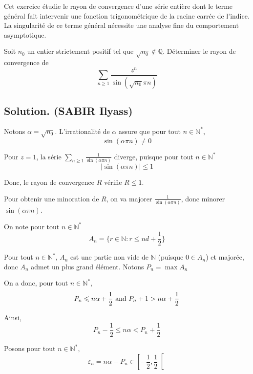 Cet exercice {\'e}tudie le rayon de convergence d'une s{\'e}rie enti{\`e}re
dont le terme g{\'e}n{\'e}ral fait intervenir une fonction trigonom{\'e}trique
de la racine carr{\'e}e de l'indice. La singularit{\'e} de ce terme
g{\'e}n{\'e}ral n{\'e}cessite une analyse fine du comportement asymptotique.

\begin{exercise}
Soit $n_0$ un entier strictement positif tel que $\sqrt{n_0} \nin \mathbb{Q}$.
D{\'e}terminer le rayon de convergence de
\[ \underset{n \geqslant 1}{\sum} \frac{z^n}{\sin (\sqrt{n_0 } \pi n)} \]

\end{exercise}

\subsection*{Solution. (SABIR Ilyass)}

Notons $\alpha = \sqrt{n_0 }$. L'irrationalit{\'e} de $\alpha$ assure que pour
tout $n \in \mathbb{N}^{\ast}$,
\[ \sin (\alpha \pi n) \neq 0 \]


Pour $z = 1$, la s{\'e}rie $\underset{n \geqslant 1}{\sum} \frac{1}{\sin
(\alpha \pi n)}$ diverge, puisque pour tout $n \in \mathbb{N}^{\ast}$
\[ | \sin (\alpha \pi n) | \leq 1 \]


Donc, le rayon de convergence $R$ v{\'e}rifie $R \leq 1$.

Pour obtenir une minoration de $R$, on va majorer $\frac{1}{\sin (\alpha \pi
n)}$, donc minorer $\sin (\alpha \pi n)$.

On note pour tout $n \in \mathbb{N}^{\ast}$
\[ A_n =\{r \in \mathbb{N}: r \leq nd + \frac{1}{2} \} \]


Pour tout $n \in \mathbb{N}^{\ast}$, $A_n$ est une partie non vide de
$\mathbb{N}$ (puisque $0 \in A_n$) et major{\'e}e, donc $A_n$ admet un plus
grand {\'e}l{\'e}ment. Notons $P_n = \max A_n$

On a donc, pour tout $n \in \mathbb{N}^{\ast}$,
\[ P_n \leqslant n \alpha + \frac{1}{2} \text{ and } P_n + 1 > n \alpha +
   \frac{1}{2} \]


Ainsi,
\[ P_n - \frac{1}{2} \leqslant n \alpha < P_n + \frac{1}{2} \]


Posons pour tout $n \in \mathbb{N}^{\ast}$,
\[ \varepsilon_n = n \alpha - P_n \in \left[ - \frac{1}{2}, \frac{1}{2} 
   \right[ \]


